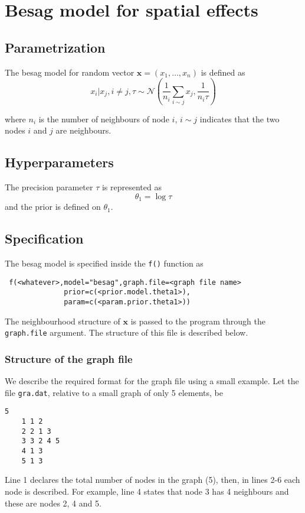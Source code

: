 \documentclass[a4paper,11pt]{article}
\begin{document}
\section*{Besag model for spatial effects}

\subsection*{Parametrization}

The besag model for random vector $\mathbf{x}=(x_1,\dots,x_n)$ is defined as
\begin{equation}\label{eq.besag}
    x_i|x_j,i\neq j,\tau\sim\mathcal{N}(\frac{1}{n_i}\sum_{i\sim j}x_j,\frac{1}{n_i\tau})
\end{equation}

where $n_i$ is the number of neighbours of node $i$, $i\sim j$
indicates that the two nodes $i$ and $j$ are neighbours.  


\subsection*{Hyperparameters}

The precision parameter $\tau$ is represented as
\begin{displaymath}
    \theta_{1} =\log \tau
\end{displaymath}
and the prior is defined on $\theta_{1}$. 

\subsection*{Specification}

The besag model is specified inside the {\tt f()} function as
\begin{verbatim}
 f(<whatever>,model="besag",graph.file=<graph file name>
              prior=c(<prior.model.theta1>),
              param=c(<param.prior.theta1>))
\end{verbatim}

The neighbourhood structure of $\mathbf{x}$ is passed to the program
through the {\tt graph.file} argument.  The structure of this file is
described below.

\subsubsection*{Structure of the graph file}

We describe the required format for the graph file using a small
example. Let the file {\tt gra.dat}, relative to a small graph of only
5 elements, be
\begin{lstlisting}[basicstyle=\footnotesize]
    5
    1 1 2
    2 2 1 3
    3 3 2 4 5 
    4 1 3
    5 1 3
\end{lstlisting}
Line 1 declares the total number of nodes in the graph (5), then, in
lines 2-6 each node is described. For example, line 4 states that node
3 has 4 neighbours and these are nodes 2, 4 and 5.
\end{document}
